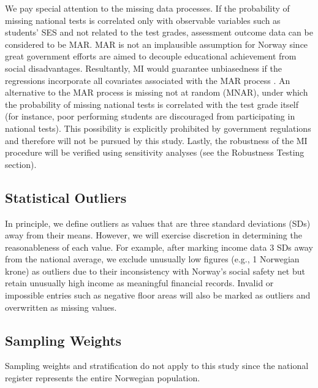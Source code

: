 We pay special attention to the missing data processes. If the probability of missing national tests is correlated only with observable variables such as students' SES and not related to the test grades, assessment outcome data can be considered to be MAR. MAR is not an implausible assumption for Norway since great government efforts are aimed to decouple educational achievement from social disadvantages. Resultantly, MI would guarantee unbiasedness if the regressions incorporate all covariates associated with the MAR process \parencite{graham:2012,vanbuuren:2018}. An alternative to the MAR process is missing not at random (MNAR), under which the probability of missing national tests is correlated with the test grade itself (for instance, poor performing students are discouraged from participating in national tests). This possibility is explicitly prohibited by government regulations and therefore will not be pursued by this study. Lastly, the robustness of the MI procedure will be verified using sensitivity analyses (see the Robustness Testing section).

\subsection{Statistical Outliers}
In principle, we define outliers as values that are three standard deviations (SDs) away from their means. However, we will exercise discretion in determining the reasonableness of each value. For example, after marking income data 3 SDs away from the national average, we exclude unusually low figures (e.g., 1 Norwegian krone) as outliers due to their inconsistency with Norway's social safety net but retain unusually high income as meaningful financial records. Invalid or impossible entries such as negative floor areas will also be marked as outliers and overwritten as missing values.

\subsection{Sampling Weights}

Sampling weights and stratification do not apply to this study since the national register represents the entire Norwegian population.
